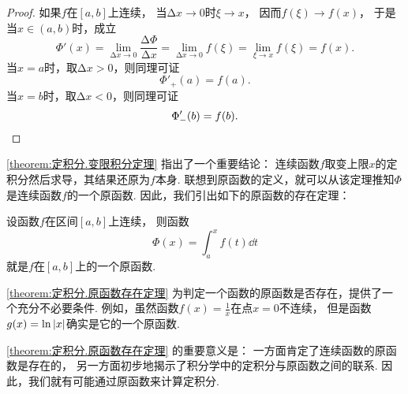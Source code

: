 \begin{theorem}
\begin{proof}
如果\(f\)在\([a,b]\)上连续，
当\(\increment x\to0\)时\(\xi \to x\)，
因而\(f(\xi) \to f(x)\)，
于是当\(x\in(a,b)\)时，成立\begin{equation*}
	\Phi'(x)
	= \lim_{\increment x\to0} \frac{\increment\Phi}{\increment x}
	= \lim_{\increment x\to0} f(\xi)
	= \lim_{\xi \to x} f(\xi)
	= f(x).
\end{equation*}
当\(x = a\)时，取\(\increment x > 0\)，则同理可证\begin{equation*}
	\Phi'_+(a) = f(a).
\end{equation*}
当\(x = b\)时，取\(\increment x < 0\)，则同理可证\begin{equation*}
	\Phi'_-(b) = f(b).
	\qedhere
\end{equation*}
\end{proof}
\end{theorem}
\cref{theorem:定积分.变限积分定理} 指出了一个重要结论：
连续函数\(f\)取变上限\(x\)的定积分然后求导，其结果还原为\(f\)本身.
联想到原函数的定义，就可以从该定理推知\(\Phi\)是连续函数\(f\)的一个原函数.
因此，我们引出如下的原函数的存在定理：
\begin{theorem}[原函数存在定理]\label{theorem:定积分.原函数存在定理}
设函数\(f\)在区间\([a,b]\)上连续，
则函数\begin{equation*}
	\Phi(x) = \int_a^x f(t) \dd{t}
\end{equation*}就是\(f\)在\([a,b]\)上的一个原函数.
\end{theorem}
\begin{remark}
\cref{theorem:定积分.原函数存在定理} 为判定一个函数的原函数是否存在，提供了一个充分不必要条件.
例如，虽然函数\(f(x) = \frac1x\)在点\(x=0\)不连续，
但是函数\(g(x) = \ln\abs{x}\)确实是它的一个原函数.
\end{remark}
\begin{remark}
\cref{theorem:定积分.原函数存在定理} 的重要意义是：
一方面肯定了连续函数的原函数是存在的，
另一方面初步地揭示了积分学中的定积分与原函数之间的联系.
因此，我们就有可能通过原函数来计算定积分.
\end{remark}

